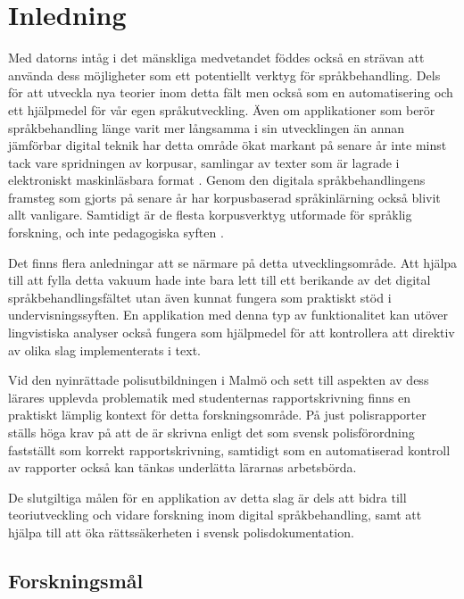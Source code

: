 \documentclass[swedish]{maucsthesis}
\begin{document}
\ifodd\value{page}\else\mbox{}\newpage\fi
\tableofcontents
\newpage
\startpagecount

\section{Inledning}
Med datorns intåg i det mänskliga medvetandet föddes också en strävan att använda
dess möjligheter som ett potentiellt verktyg för språkbehandling. Dels för
att utveckla nya teorier inom detta fält men också som en automatisering och ett
hjälpmedel för vår egen språkutveckling. Även om applikationer som berör
språkbehandling länge varit mer långsamma i sin utvecklingen än annan jämförbar
digital teknik har detta område ökat markant på senare år inte minst tack vare
spridningen av korpusar, samlingar av texter som är lagrade i elektroniskt
maskinläsbara format \cite{nugues:2014}. Genom den digitala språkbehandlingens framsteg
som gjorts på senare år har korpusbaserad språkinlärning också blivit allt
vanligare. Samtidigt är de flesta korpusverktyg utformade för språklig
forskning, och inte pedagogiska syften \cite{zhu:2015}.

Det finns flera anledningar att se närmare på detta utvecklingsområde. Att hjälpa till att fylla detta vakuum hade inte bara lett till ett berikande av det digital språkbehandlingsfältet utan även kunnat fungera som praktiskt stöd i undervisningssyften.
En applikation med denna typ av funktionalitet kan utöver lingvistiska analyser
också fungera som hjälpmedel för att kontrollera att direktiv av olika slag
implementerats i text.

Vid den nyinrättade polisutbildningen i Malmö och sett till aspekten av dess
lärares upplevda problematik med studenternas rapportskrivning finns en
praktiskt lämplig kontext för detta forskningsområde. På just polisrapporter
ställs höga krav på att de är skrivna enligt det som svensk polisförordning fastställt som korrekt rapportskrivning, samtidigt som en automatiserad kontroll av rapporter också kan tänkas underlätta lärarnas arbetsbörda.

De slutgiltiga målen för en applikation av detta slag är dels att bidra till
teoriutveckling och vidare forskning inom digital språkbehandling, samt att hjälpa till att
öka rättssäkerheten i svensk polisdokumentation.

\subsection{Forskningsmål}
\end{document}
